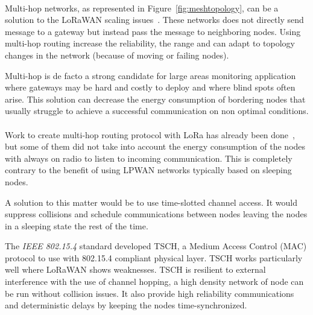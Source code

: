 


\paragraph{}

Multi-hop networks, as represented in Figure~\ref{fig:meshtopology}, can be a solution to
the LoRaWAN scaling issues~\cite{8115756}.
These networks does not directly send message to a gateway but instead pass the
message to neighboring nodes.
Using multi-hop routing increase the reliability, the range
and can adapt to topology changes in the network (because of moving or failing nodes).

Multi-hop is de facto a strong candidate for large areas monitoring application
where gateways may be hard and costly to deploy and where blind spots often arise.
This solution can decrease the energy consumption of bordering nodes that
usually struggle to achieve a successful communication on non optimal
conditions.

\paragraph{}

Work to create multi-hop routing protocol with LoRa has already been
done~\cite{8115756, DIAS2018424, 8856256, Abrardo_2019, duong2018}, 
but some of them did not take into account the energy consumption of the nodes
with always on radio to listen to incoming communication.
This is completely contrary to the benefit of using LPWAN networks typically
based on sleeping nodes.

A solution to this matter would be to use time-slotted channel access.
It would suppress collisions and schedule communications between nodes leaving
the nodes in a sleeping state the rest of the time.

The \emph{IEEE 802.15.4} standard developed TSCH, a Medium Access Control (MAC)
protocol to use with 802.15.4 compliant physical layer.
TSCH works particularly well where LoRaWAN shows weaknesses. 
TSCH is resilient to external interference with the use of channel hopping, a
high density network of node can be run without collision issues.
It also provide high reliability communications and deterministic delays by 
keeping the nodes time-synchronized.

